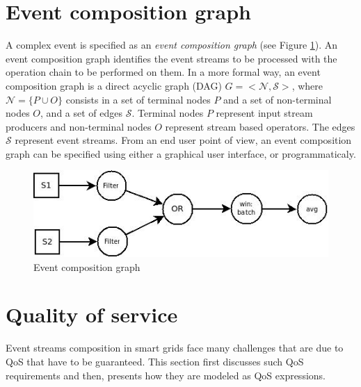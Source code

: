  \section{Event composition graph}
 \label{ch3:sec5}
 A complex event is specified as an \textit{event composition graph} (see Figure \ref{fig:ecg}). An event composition graph identifies the event streams to be processed with the operation chain to be performed on them. In a more formal way, an event composition graph is a direct acyclic graph (DAG) $G=<\mathcal{N}, \mathcal{S}>$, where $\mathcal{N}= \{P \cup O\}$ consists in a set of terminal nodes $P$ and a set of non-terminal nodes $O$, and a set of edges $\mathcal{S}$. Terminal nodes $P$ represent input stream producers and non-terminal nodes $O$ represent stream based operators. The edges $\mathcal{S}$ represent event streams. From an end user point of view, an event composition graph can be specified using either a graphical user interface, or programmaticaly. 
 \begin{figure}[H]
  \begin{center}
    \includegraphics[scale=0.65]{chap3/images/ecg.jpg}
  \end{center}
  \caption{Event composition graph}
  \label{fig:ecg}
\end{figure}
 
 \section{Quality of service}
 \label{ch3:sec-three}
 Event streams composition in smart grids face many challenges that are due to QoS that have to be guaranteed. This section first discusses such QoS requirements and then, presents how they are modeled as QoS expressions.              
